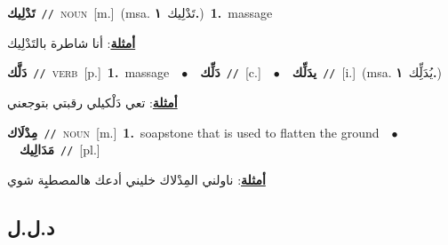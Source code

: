 \documentclass[10pt,a4paper,twoside]{article} %
\begin{document}
\begin{multicols}{2}
{\setlength\topsep{0pt}\textbf{\foreignlanguage{arabic}{تَدْلِيك}}\ {\color{gray}\texttt{//}\color{black}}\ \textsc{noun}\ [m.]\ \color{gray}(msa. \foreignlanguage{arabic}{تَدْلِيك}~\foreignlanguage{arabic}{\textbf{١.}})\color{black}\ \textbf{1.}~massage\  \begin{flushright}\color{gray}\foreignlanguage{arabic}{\textbf{\underline{\foreignlanguage{arabic}{أمثلة}}}: أنا شاطرة بالتَدْلِيك}\end{flushright}\color{black}} \vspace{2mm}

{\setlength\topsep{0pt}\textbf{\foreignlanguage{arabic}{دَلَّك}}\ {\color{gray}\texttt{//}\color{black}}\ \textsc{verb}\ [p.]\ \textbf{1.}~massage\ \ $\bullet$\ \ \setlength\topsep{0pt}\textbf{\foreignlanguage{arabic}{دَلِّك}}\ {\color{gray}\texttt{//}\color{black}}\ [c.]\ \ $\bullet$\ \ \setlength\topsep{0pt}\textbf{\foreignlanguage{arabic}{يدَلِّك}}\ {\color{gray}\texttt{//}\color{black}}\ [i.]\ \color{gray}(msa. \foreignlanguage{arabic}{يُدَلِِّك}~\foreignlanguage{arabic}{\textbf{١.}})\color{black}\  \begin{flushright}\color{gray}\foreignlanguage{arabic}{\textbf{\underline{\foreignlanguage{arabic}{أمثلة}}}: تعي دَلْكيلي رقبتي بتوجعني}\end{flushright}\color{black}} \vspace{2mm}

{\setlength\topsep{0pt}\textbf{\foreignlanguage{arabic}{مِدْلَاك}}\ {\color{gray}\texttt{//}\color{black}}\ \textsc{noun}\ [m.]\ \textbf{1.}~soapstone that is used to flatten the ground\ \ $\bullet$\ \ \setlength\topsep{0pt}\textbf{\foreignlanguage{arabic}{مَدَالِيك}}\ {\color{gray}\texttt{//}\color{black}}\ [pl.]\  \begin{flushright}\color{gray}\foreignlanguage{arabic}{\textbf{\underline{\foreignlanguage{arabic}{أمثلة}}}: ناولني المِدْلاك خليني أدعك هالمصطبِِة شوي}\end{flushright}\color{black}} \vspace{2mm}

\vspace{-3mm}
\subsection*{\color{blue}\foreignlanguage{arabic}{د.ل.ل}\color{blue}{}} 


\end{multicols}
\end{document}
